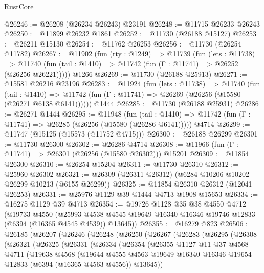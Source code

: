 \begin{lexlean}{RustCore}
\begin{coremodule}
@26246 := @26208 (@26234 @26243) @23191
@26248 := @11715 @26233 @26243
@26250 := @11899 @26232 @1861
@26252 := @11730 (@26188 @15127)
@26253 := @26211 @15130
@26254 := @11762 @26253
@26256 := @11730 (@26254 @11782)
@26267 := @11902
    (fun (rty : @1249) =>
    @11739
      (fun (lets : @11738) =>
      @11740 (fun (tail : @1410) => @11742 (fun (Γ : @11741) => @26252 (@26256 @26221)))))
    @1266
@26269 := @11730 (@26188 @25913)
@26271 := @15581 @26216 @23196
@26283 := @11924
    (fun (lets : @11738) =>
    @11740
      (fun (tail : @1410) =>
      @11742 (fun (Γ : @11741) => @26269 (@26256 (@15580 (@26271 @6138 @6141))))))
    @1444
@26285 := @11730 (@26188 @25931)
@26286 := @26271 @1444
@26295 := @11948
    (fun (tail : @1410) => @11742 (fun (Γ : @11741) => @26285 (@26256 (@15580 (@26286 @6141)))))
    @4714
@26299 := @11747 (@15125 (@15573 (@11752 @4715)))
@26300 := @26188 @26299
@26301 := @11730 @26300
@26302 := @26286 @4714
@26308 := @11966 (fun (Γ : @11741) => @26301 (@26256 (@15580 @26302))) @15201
@26309 := @11854 @26300
@26310 := @26254 @15204
@26311 := @11730 @26310
@26312 := @25960 @26302
@26321 := @26309 (@26311 @26312) (@6284 @10206 @10202 @26299 @10213 (@6155 @26299))
@26325 := @11854 @26310 @26312 (@12041 @26253)
@26331 := @25976 @1129 @39 @1444 @4713 @1908 @15653
@26334 := @16275 @1129 @39 @4713
@26354 := @19726
    @1128
    @35
    @38
    @4550
    @4712
    (@19733
      @4550
      (@25993 @4538 @4545 @19649 @16340 @16346 @19746 @12833 (@6394 (@16365 @4545 @4539)) @13645))
@26355 := @16279 @823
@26506 := @26185
    (@26207
      (@26246
        (@26248
          (@26250
            (@26267
              (@26283
                (@26295
                  (@26308
                    (@26321
                      (@26325
                        (@26331
                          (@26334
                            (@26354
                              (@26355
                                @1127
                                @11
                                @37
                                @4568
                                @4711
                                (@19638
                                  @4568
                                  (@19644
                                    @4555
                                    @4563
                                    @19649
                                    @16340
                                    @16346
                                    @19654
                                    @12833
                                    (@6394 (@16365 @4563 @4556))
                                    @13645))

\end{coremodule}
\end{lexlean}
